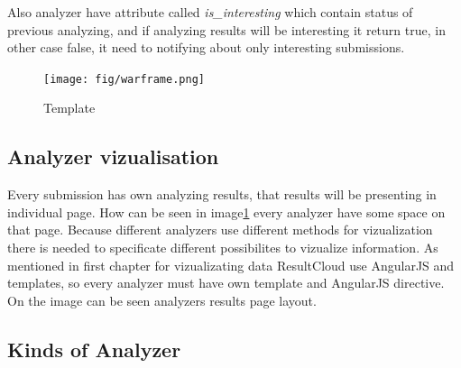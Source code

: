Also analyzer have attribute called \emph{is\_interesting} which contain status of previous analyzing, and if analyzing results will be interesting it return true, in other case false, it need to notifying about only interesting submissions.

\begin{figure}
  \centering
    \texttt{[image: fig/warframe.png]}
  \caption{Template}
  \label{fig:temp}
\end{figure}

\subsection{Analyzer vizualisation}

Every submission has own analyzing results, that results will be presenting in individual page. How can be seen in image\ref{fig:temp} every analyzer have some space on that page. Because different analyzers use different methods for vizualization there is needed to specificate different possibilites to vizualize information. As mentioned in first chapter for vizualizating data ResultCloud use AngularJS and templates, so every analyzer must have own template and AngularJS  directive. On the image can be seen analyzers results page layout.

\subsection{Kinds of Analyzer}

